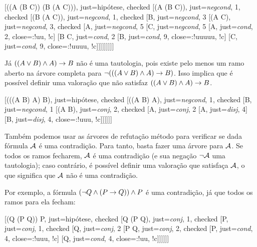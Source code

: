 \begin{center}
\begin{tableau}
	{
	}
	[\enot((A \eif (B \eif C)) \eif (B \eif (A \eif C))), just={hipótese}, checked
	[(A \eif (B \eif C)), just={\emph{negcond}, 1}, checked
	[\enot (B \eif (A \eif C)), just={\emph{negcond}, 1}, checked
	[B, just={\emph{negcond}, 3}
	[\enot(A \eif C), just={\emph{negcond}, 3}, checked
	[A, just={\emph{negcond}, 5}
	[\enot C, just={\emph{negcond}, 5}
		[\enot A, just={\emph{cond}, 2}, close={:!uu, !c}]
		[B \eif C, just={\emph{cond}, 2}
			[\enot B,  just={\emph{cond}, 9}, close={:!uuuuu, !c}]
			[C, just={\emph{cond}, 9}, close={:!uuuu, !c}]]]]]]]]]
\end{tableau}
\end{center}

Já $((A \vee B) \wedge A) \rightarrow B$ não é uma tautologia, pois existe pelo menos um ramo aberto na árvore completa para $\neg(((A \vee B) \wedge A) \rightarrow B)$.
Isso implica que é possível definir uma valoração que não satisfaz $((A \vee B) \wedge A) \rightarrow B$.

\begin{center}
	\begin{tableau}
		{
		}
		[\enot(((A \eor B) \eand A) \eif B), just={hipótese}, checked
		[((A \eor B) \eand A), just={\emph{negcond}, 1}, checked
		[\enot B, just={\emph{negcond}, 1}
		[(A \eor B), just={\emph{conj}, 2}, checked
		[A, just={\emph{conj}, 2}
			[A, just={\emph{disj}, 4}]
			[B, just={\emph{disj}, 4}, close={:!uuu, !c}]]]]]]
	\end{tableau}
\end{center}

Também podemos usar as árvores de refutação método para verificar se dada fórmula $\mathcal{A}$ é uma contradição. 
Para tanto, basta fazer uma árvore para $\mathcal{A}$.
Se todos os ramos fecharem, $\mathcal{A}$ é uma contradição (e sua negação $\neg \mathcal{A}$ uma tautologia); caso contrário, é possível definir uma valoração que satisfaça $\mathcal{A}$, o que significa que $\mathcal{A}$ não é uma contradição.

Por exemplo, a fórmula $(\neg Q \wedge (P \rightarrow Q)) \wedge P$ é uma contradição, já que todos os ramos para ela fecham:

\begin{center}
\begin{tableau}
	{
	}
	[(\enot Q \eand (P \eif Q)) \eand P, just={hipótese}, checked
	[\enot Q \eand (P \eif Q), just={\emph{conj}, 1}, checked
	[P, just={\emph{conj}, 1}, checked
	[\enot Q, just={\emph{conj}, 2}
	[P \eif Q, just={\emph{conj}, 2}, checked
		[\enot P, just={\emph{cond}, 4}, close={:!uuu, !c}]
		[Q, just={\emph{cond}, 4}, close={:!uu, !c}]]]]]]
\end{tableau}
\end{center}


